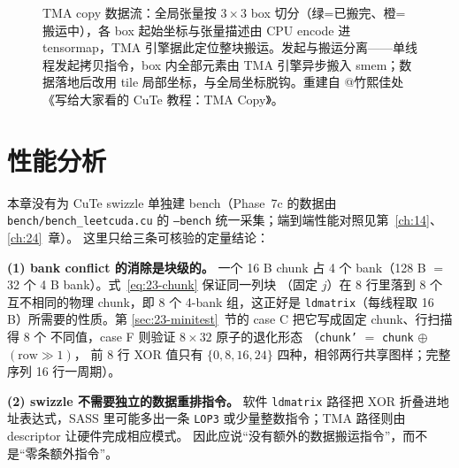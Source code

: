 \begin{figure}[htbp]
\caption{TMA copy 数据流：全局张量按 $3\times3$ box 切分（绿=已搬完、橙=搬运中），各 box 起始坐标与张量描述由 CPU encode 进 tensormap，TMA 引擎据此定位整块搬运。发起与搬运分离——单线程发起拷贝指令，box 内全部元素由 TMA 引擎异步搬入 smem；数据落地后改用 tile 局部坐标，与全局坐标脱钩。重建自 @竹熙佳处《写给大家看的 CuTe 教程：TMA Copy》。}
\label{fig:23-2}
\end{figure}

\section{性能分析}

本章没有为 CuTe swizzle 单独建 bench（Phase~7c 的数据由 \texttt{bench/bench\_leetcuda.cu}
的 \texttt{--bench} 统一采集；端到端性能对照见第~\ref{ch:14}、\ref{ch:24}~章）。
这里只给三条可核验的定量结论：

\textbf{(1) bank conflict 的消除是块级的。} 一个 16 B chunk 占 4 个
bank（128 B $=$ 32 个 4 B bank）。式~\eqref{eq:23-chunk} 保证同一列块
（固定 $j$）在 8 行里落到 8 个互不相同的物理 chunk，即 8 个 4-bank
组，这正好是 \texttt{ldmatrix}（每线程取 16 B）所需要的性质。第
\ref{sec:23-minitest}~节的 case C 把它写成固定 chunk、行扫描得 8 个
不同值，case F 则验证 $8\times32$ 原子的退化形态
（\texttt{chunk'} $=$ \texttt{chunk} $\oplus$ $(\text{row}\gg1)$，
前 8 行 XOR 值只有 $\{0,8,16,24\}$ 四种，相邻两行共享图样；完整序列 16 行一周期）。

\textbf{(2) swizzle 不需要独立的数据重排指令。} 软件
\texttt{ldmatrix} 路径把 XOR 折叠进地址表达式，SASS 里可能多出一条
\texttt{LOP3} 或少量整数指令；TMA 路径则由 descriptor 让硬件完成相应模式。
因此应说“没有额外的数据搬运指令”，而不是“零条额外指令”。

